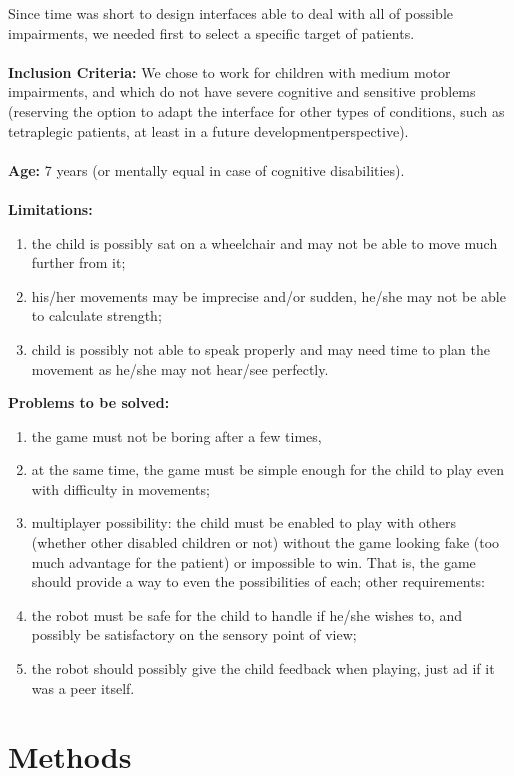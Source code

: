 \documentclass[a4paper,twoside]{book}
\begin{document}
Since time was short to design interfaces able to deal with all of possible impairments, we needed first to select a specific target of patients.
\\
\\
\textbf{Inclusion Criteria:} We chose to work for children with medium motor impairments, and which do not have severe cognitive and sensitive problems (reserving the option to adapt the interface for other types of conditions, such as tetraplegic patients, at least in a future development\textendash perspective).
\\
\\
\textbf{Age:} 7 years (or mentally equal in case of cognitive disabilities).
\\
\\
\textbf{Limitations:}
\begin{enumerate}
\item the child is possibly sat on a wheelchair and may not be able to move much further from it;
\item his/her movements may be imprecise and/or sudden, he/she may not be able to calculate strength;
\item child is possibly not able to speak properly and may need time to plan the movement as he/she may not hear/see perfectly.
\end{enumerate}
\textbf{Problems to be solved:}
\begin{enumerate}
\item the game must not be boring after a few times,
\item at the same time, the game must be simple enough for the child to play even with difficulty in movements;
\item multi\textendash player possibility: the child must be enabled to play with others (whether other disabled children or not) without the game looking fake (too much advantage for the patient) or impossible to win. That is, the game should provide a way to even the possibilities of each;  
other requirements:
\item the robot must be safe for the child to handle if he/she wishes to, and possibly be satisfactory on the sensory point of view;
\item the robot should possibly give the child feedback when playing, just ad if it was a peer itself.
\end{enumerate}

\chapter{Methods}
\end{document}
